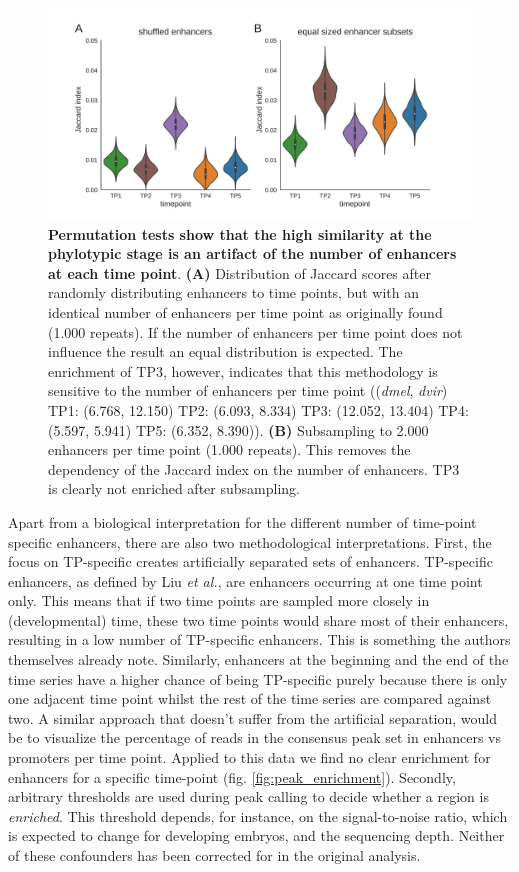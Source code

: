 \begin{figure}[H]
    \includegraphics[width=\linewidth]{ch.hourglass/images/fly_shuffle.png}
    \caption{\textbf{Permutation tests show that the high similarity at the phylotypic stage is an artifact of the number of enhancers at each time point}. \textbf{(A)} Distribution of Jaccard scores after randomly distributing enhancers to time points, but with an identical number of enhancers per time point as originally found (1.000 repeats). If the number of enhancers per time point does not influence the result an equal distribution is expected. The enrichment of TP3, however, indicates that this methodology is sensitive to the number of enhancers per time point ((\textit{dmel}, \textit{dvir}) TP1: (6.768, 12.150) TP2: (6.093, 8.334) TP3: (12.052, 13.404) TP4: (5.597, 5.941) TP5: (6.352, 8.390)). \textbf{(B)} Subsampling to 2.000 enhancers per time point (1.000 repeats). This removes the dependency of the Jaccard index on the number of enhancers. TP3 is clearly not enriched after subsampling.}
    \label{fig:shuffle}
\end{figure}

Apart from a biological interpretation for the different number of time-point specific enhancers, there are also two methodological interpretations. First, the focus on TP-specific creates artificially separated sets of enhancers. TP-specific enhancers, as defined by Liu \textit{et al.}, are enhancers occurring at one time point only. This means that if two time points are sampled more closely in (developmental) time, these two time points would share most of their enhancers, resulting in a low number of TP-specific enhancers. This is something the authors themselves already note. Similarly, enhancers at the beginning and the end of the time series have a higher chance of being TP-specific purely because there is only one adjacent time point whilst the rest of the time series are compared against two. A similar approach that doesn't suffer from the artificial separation, would be to visualize the percentage of reads in the consensus peak set in enhancers vs promoters per time point. Applied to this data we find no clear enrichment for enhancers for a specific time-point (fig. \ref{fig:peak_enrichment}). Secondly, arbitrary thresholds are used during peak calling to decide whether a region is \textit{enriched}. This threshold depends, for instance, on the signal-to-noise ratio, which is expected to change for developing embryos, and the sequencing depth\cite{encode_guidelines2012}. Neither of these confounders has been corrected for in the original analysis.

